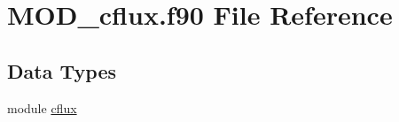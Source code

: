 \hypertarget{MOD__cflux_8f90}{\section{M\-O\-D\-\_\-cflux.\-f90 File Reference}
\label{MOD__cflux_8f90}
}
\subsection*{Data Types}
\begin{DoxyCompactItemize}
\item 
module \hyperlink{classcflux}{cflux}
\end{DoxyCompactItemize}
